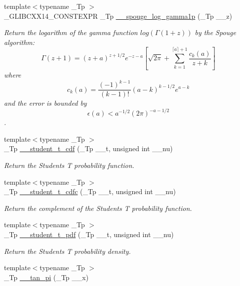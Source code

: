 \begin{DoxyCompactItemize}
{\footnotesize template$<$typename \+\_\+\+Tp $>$ }\\\+\_\+\+G\+L\+I\+B\+C\+X\+X14\+\_\+\+C\+O\+N\+S\+T\+E\+X\+PR \+\_\+\+Tp \hyperlink{namespacestd_1_1____detail_a29cdf96d3726e15cb0652736971ba5a9}{\+\_\+\+\_\+spouge\+\_\+log\+\_\+gamma1p} (\+\_\+\+Tp \+\_\+\+\_\+z)
\begin{DoxyCompactList}\small\item\em Return the logarithm of the gamma function $ log(\Gamma(1+z)) $ by the Spouge algorithm\+: \[ \Gamma(z+1) = (z+a)^{z+1/2}e^{-z-a}\left[ \sqrt{2\pi} + \sum_{k=1}^{\lceil a \rceil + 1}\frac{c_k(a)}{z+k}\right] \] where \[ c_k(a) = \frac{(-1)^{k-1}}{(k-1)!}(a-k)^{k-1/2}e^{a-k} \] and the error is bounded by \[ \epsilon(a) < a^{-1/2}(2\pi)^{-a-1/2} \]. \end{DoxyCompactList}\item 
{\footnotesize template$<$typename \+\_\+\+Tp $>$ }\\\+\_\+\+Tp \hyperlink{namespacestd_1_1____detail_aadc19f2a38494343a752a8d4f924e3df}{\+\_\+\+\_\+student\+\_\+t\+\_\+cdf} (\+\_\+\+Tp \+\_\+\+\_\+t, unsigned int \+\_\+\+\_\+nu)
\begin{DoxyCompactList}\small\item\em Return the Students T probability function. \end{DoxyCompactList}\item 
{\footnotesize template$<$typename \+\_\+\+Tp $>$ }\\\+\_\+\+Tp \hyperlink{namespacestd_1_1____detail_a3009eaaa4b7d6d845878765ef0e3fa27}{\+\_\+\+\_\+student\+\_\+t\+\_\+cdfc} (\+\_\+\+Tp \+\_\+\+\_\+t, unsigned int \+\_\+\+\_\+nu)
\begin{DoxyCompactList}\small\item\em Return the complement of the Students T probability function. \end{DoxyCompactList}\item 
{\footnotesize template$<$typename \+\_\+\+Tp $>$ }\\\+\_\+\+Tp \hyperlink{namespacestd_1_1____detail_a866bf8f03fd2d5de5024837727beecd8}{\+\_\+\+\_\+student\+\_\+t\+\_\+pdf} (\+\_\+\+Tp \+\_\+\+\_\+t, unsigned int \+\_\+\+\_\+nu)
\begin{DoxyCompactList}\small\item\em Return the Students T probability density. \end{DoxyCompactList}\item 
{\footnotesize template$<$typename \+\_\+\+Tp $>$ }\\\+\_\+\+Tp \hyperlink{namespacestd_1_1____detail_a72fd3b7fcf9f49ade9411d782e8dbe4e}{\+\_\+\+\_\+tan\+\_\+pi} (\+\_\+\+Tp \+\_\+\+\_\+x)

\end{DoxyCompactItemize}
